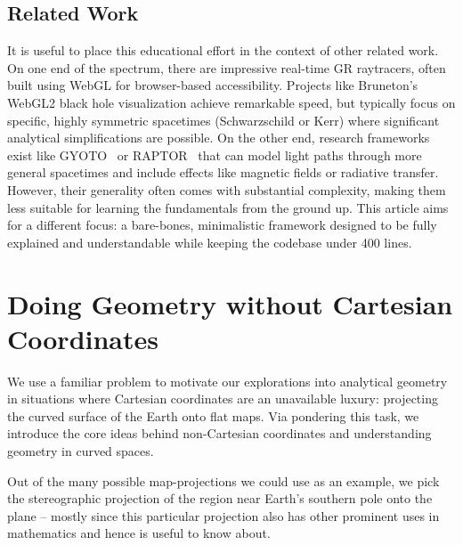 \documentclass[twocolumn]{article}
\begin{document}
\subsection{Related Work}

It is useful to place this educational effort in the context of other
related work. On one end of the spectrum, there are impressive
real-time GR raytracers, often built using WebGL for browser-based
accessibility.  Projects like Bruneton's~\cite{bruneton2020} WebGL2
black hole visualization achieve remarkable speed, but typically focus
on specific, highly symmetric spacetimes (Schwarzschild or Kerr) where
significant analytical simplifications are possible. On the other end,
research frameworks exist like GYOTO~\cite{vincent2011} or
RAPTOR~\cite{bronzwaer2018} that can model light paths through more
general spacetimes and include effects like magnetic fields or
radiative transfer. However, their generality often comes with
substantial complexity, making them less suitable for learning the
fundamentals from the ground up. This article aims for a different
focus: a bare-bones, minimalistic framework designed to be fully
explained and understandable while keeping the codebase under
400 lines.

\section{Doing Geometry without Cartesian Coordinates}\label{sec:geometry}

We use a familiar problem to motivate our explorations into analytical
geometry in situations where Cartesian coordinates are an unavailable
luxury: projecting the curved surface of the Earth onto flat maps. Via
pondering this task, we introduce the core ideas behind non-Cartesian
coordinates and understanding geometry in curved spaces.

Out of the many possible map-projections we could use as an example,
we pick the stereographic projection of the region near Earth's
southern pole onto the plane -- mostly since this particular
projection also has other prominent uses in mathematics and hence is
useful to know about.
\end{document}
